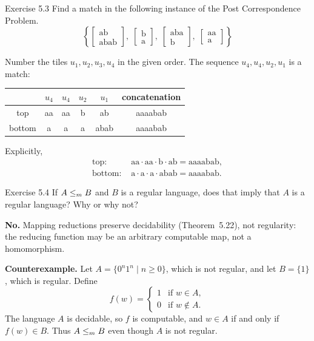 \begin{question}{Exercise 5.3}
Find a match in the following instance of the Post Correspondence Problem.
\[
\left\{
\begin{bmatrix} \mathrm{ab}\\ \mathrm{abab}\end{bmatrix},\;
\begin{bmatrix} \mathrm{b}\\ \mathrm{a}\end{bmatrix},\;
\begin{bmatrix} \mathrm{aba}\\ \mathrm{b}\end{bmatrix},\;
\begin{bmatrix} \mathrm{aa}\\ \mathrm{a}\end{bmatrix}
\right\}
\]
\end{question}
\begin{soln}
Number the tiles $u_1,u_2,u_3,u_4$ in the given order. The sequence $u_4,u_4,u_2,u_1$ is a match:
\begin{center}
\begin{tabular}{@{}c|cccc|c@{}}
 & $u_4$ & $u_4$ & $u_2$ & $u_1$ & concatenation \\
\midrule
top    & aa & aa & b & ab   & aaaabab \\
bottom & a  & a  & a & abab & aaaabab \\
\end{tabular}
\end{center}
Explicitly,
\begin{align*}
\text{top: }& \mathrm{aa}\cdot\mathrm{aa}\cdot\mathrm{b}\cdot\mathrm{ab}=\mathrm{aaaabab},\\
\text{bottom: }& \mathrm{a}\cdot\mathrm{a}\cdot\mathrm{a}\cdot\mathrm{abab}=\mathrm{aaaabab}.
\end{align*}
\end{soln}

\begin{question}{Exercise 5.4}
If $A\le_{m} B$ and $B$ is a regular language, does that imply that $A$ is a regular language? Why or why not?
\end{question}
\begin{soln}
\textbf{No.} Mapping reductions preserve decidability (Theorem~5.22), not regularity: the reducing function may be an arbitrary computable map, not a homomorphism.

\textbf{Counterexample.} Let $A=\{0^n1^n\mid n\ge 0\}$, which is not regular, and let $B=\{1\}$, which is regular. Define
\[
f(w)=\begin{cases}
1 & \text{if }w\in A,\\
0 & \text{if }w\notin A.
\end{cases}
\]
The language $A$ is decidable, so $f$ is computable, and $w\in A$ if and only if $f(w)\in B$. Thus $A\le_{m} B$ even though $A$ is not regular.
\end{soln}

